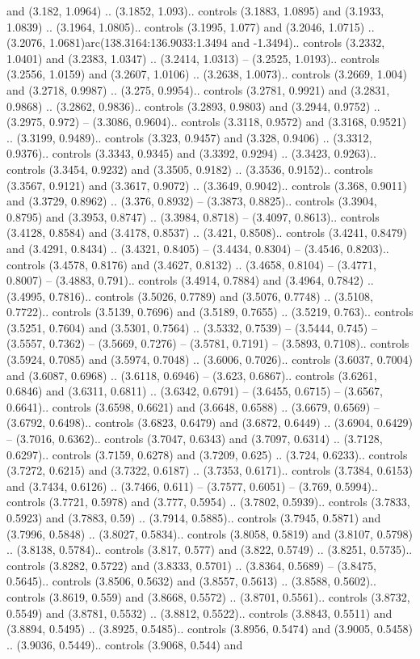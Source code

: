and (3.182, 1.0964) .. (3.1852, 1.093).. controls (3.1883, 1.0895) and (3.1933, 1.0839) .. (3.1964, 1.0805).. controls (3.1995, 1.077) and (3.2046, 1.0715) .. (3.2076, 1.0681)arc(138.3164:136.9033:1.3494 and -1.3494).. controls (3.2332, 1.0401) and (3.2383, 1.0347) .. (3.2414, 1.0313) -- (3.2525, 1.0193).. controls (3.2556, 1.0159) and (3.2607, 1.0106) .. (3.2638, 1.0073).. controls (3.2669, 1.004) and (3.2718, 0.9987) .. (3.275, 0.9954).. controls (3.2781, 0.9921) and (3.2831, 0.9868) .. (3.2862, 0.9836).. controls (3.2893, 0.9803) and (3.2944, 0.9752) .. (3.2975, 0.972) -- (3.3086, 0.9604).. controls (3.3118, 0.9572) and (3.3168, 0.9521) .. (3.3199, 0.9489).. controls (3.323, 0.9457) and (3.328, 0.9406) .. (3.3312, 0.9376).. controls (3.3343, 0.9345) and (3.3392, 0.9294) .. (3.3423, 0.9263).. controls (3.3454, 0.9232) and (3.3505, 0.9182) .. (3.3536, 0.9152).. controls (3.3567, 0.9121) and (3.3617, 0.9072) .. (3.3649, 0.9042).. controls (3.368, 0.9011) and (3.3729, 0.8962) .. (3.376, 0.8932) -- (3.3873, 0.8825).. controls (3.3904, 0.8795) and (3.3953, 0.8747) .. (3.3984, 0.8718) -- (3.4097, 0.8613).. controls (3.4128, 0.8584) and (3.4178, 0.8537) .. (3.421, 0.8508).. controls (3.4241, 0.8479) and (3.4291, 0.8434) .. (3.4321, 0.8405) -- (3.4434, 0.8304) -- (3.4546, 0.8203).. controls (3.4578, 0.8176) and (3.4627, 0.8132) .. (3.4658, 0.8104) -- (3.4771, 0.8007) -- (3.4883, 0.791).. controls (3.4914, 0.7884) and (3.4964, 0.7842) .. (3.4995, 0.7816).. controls (3.5026, 0.7789) and (3.5076, 0.7748) .. (3.5108, 0.7722).. controls (3.5139, 0.7696) and (3.5189, 0.7655) .. (3.5219, 0.763).. controls (3.5251, 0.7604) and (3.5301, 0.7564) .. (3.5332, 0.7539) -- (3.5444, 0.745) -- (3.5557, 0.7362) -- (3.5669, 0.7276) -- (3.5781, 0.7191) -- (3.5893, 0.7108).. controls (3.5924, 0.7085) and (3.5974, 0.7048) .. (3.6006, 0.7026).. controls (3.6037, 0.7004) and (3.6087, 0.6968) .. (3.6118, 0.6946) -- (3.623, 0.6867).. controls (3.6261, 0.6846) and (3.6311, 0.6811) .. (3.6342, 0.6791) -- (3.6455, 0.6715) -- (3.6567, 0.6641).. controls (3.6598, 0.6621) and (3.6648, 0.6588) .. (3.6679, 0.6569) -- (3.6792, 0.6498).. controls (3.6823, 0.6479) and (3.6872, 0.6449) .. (3.6904, 0.6429) -- (3.7016, 0.6362).. controls (3.7047, 0.6343) and (3.7097, 0.6314) .. (3.7128, 0.6297).. controls (3.7159, 0.6278) and (3.7209, 0.625) .. (3.724, 0.6233).. controls (3.7272, 0.6215) and (3.7322, 0.6187) .. (3.7353, 0.6171).. controls (3.7384, 0.6153) and (3.7434, 0.6126) .. (3.7466, 0.611) -- (3.7577, 0.6051) -- (3.769, 0.5994).. controls (3.7721, 0.5978) and (3.777, 0.5954) .. (3.7802, 0.5939).. controls (3.7833, 0.5923) and (3.7883, 0.59) .. (3.7914, 0.5885).. controls (3.7945, 0.5871) and (3.7996, 0.5848) .. (3.8027, 0.5834).. controls (3.8058, 0.5819) and (3.8107, 0.5798) .. (3.8138, 0.5784).. controls (3.817, 0.577) and (3.822, 0.5749) .. (3.8251, 0.5735).. controls (3.8282, 0.5722) and (3.8333, 0.5701) .. (3.8364, 0.5689) -- (3.8475, 0.5645).. controls (3.8506, 0.5632) and (3.8557, 0.5613) .. (3.8588, 0.5602).. controls (3.8619, 0.559) and (3.8668, 0.5572) .. (3.8701, 0.5561).. controls (3.8732, 0.5549) and (3.8781, 0.5532) .. (3.8812, 0.5522).. controls (3.8843, 0.5511) and (3.8894, 0.5495) .. (3.8925, 0.5485).. controls (3.8956, 0.5474) and (3.9005, 0.5458) .. (3.9036, 0.5449).. controls (3.9068, 0.544) and 